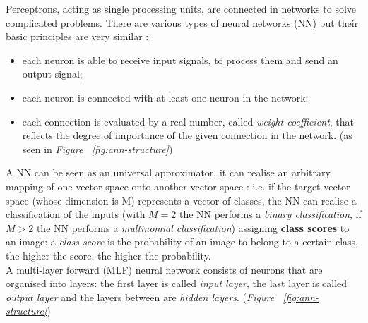 \documentclass[../main.tex]{subfiles}
\begin{document}
Perceptrons, acting as single processing units, are connected in networks to solve complicated problems. There are various types of neural networks (NN) but their basic principles are very similar \cite{Svozil1997}: 
\begin{itemize}
	\item each neuron is able to receive input signals, to process them and send an output signal;
	\item each neuron is connected with at least one neuron in the network; 
	\item each connection is evaluated by a real number, called \textit{weight coefficient}, that reflects the degree of importance of the given connection in the network. (as seen in \textit{Figure ~\ref{fig:ann-structure}})
\end{itemize}
A NN can be seen as an universal approximator, it can realise an arbitrary mapping of one vector space onto another vector space \cite{Svozil1997}: i.e. if the target vector space (whose dimension is M) represents a vector of classes, the NN can realise a classification of the inputs (with $M=2$ the NN performs a \textit{binary classification}, if $M>2$ the NN performs a \textit{multinomial classification}) assigning \textbf{class scores} to an image: a \textit{class score} is the probability of an image to belong to a certain class, the higher the score, the higher the probability.   \\ 
A multi-layer forward (MLF) neural network consists of neurons that are organised into layers: the first layer is called \textit{input layer}, the last layer is called \textit{output layer} and the layers between are \textit{hidden layers}. \cite{Svozil1997} (\textit{Figure ~\ref{fig:ann-structure}}) 

\vspace{5mm}
\end{document}
